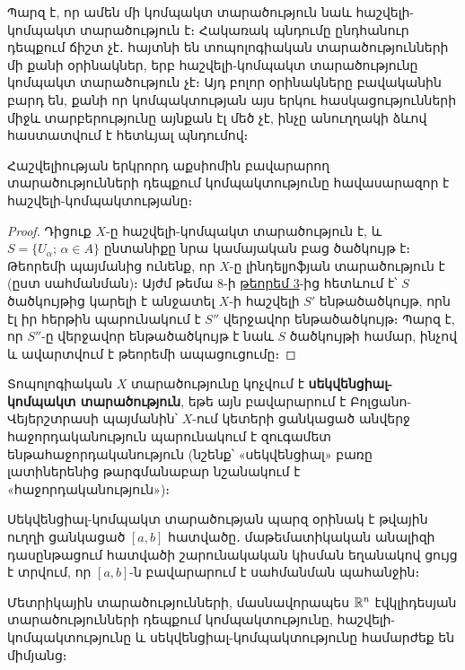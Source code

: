 \documentclass[./main.tex]{subfiles}
\begin{document}
\par Պարզ է, որ ամեն մի կոմպակտ տարածություն նաև հաշվելի-կոմպակտ տարա\-ծություն է։ Հակառակ պնդումը ընդհանուր դեպքում ճիշտ չէ․ հայտնի են տոպոլոգի\-ա\-կան տարածությունների մի քանի օրինակներ, երբ հաշվելի-կոմպակտ տարա\-ծու\-թյունը կոմպակտ տարածություն չէ։ Այդ բոլոր օրինակները բավականին բարդ են, քանի որ կոմպակտության այս երկու հասկացությունների միջև տարբերու\-թյու\-նը այնքան էլ մեծ չէ, ինչը անուղղակի ձևով հաստատվում է հետևյալ պնդումով։

\begin{theorem}\label{ch17thm11}
Հաշվելիության երկրորդ աքսիոմին բավարարող տարածություն\-նե\-րի դեպքում կոմպակտությունը հավասարազոր է հաշվելի-կոմպակտությանը։
\end{theorem}

\begin{proof}
Դիցուք $X$-ը հաշվելի-կոմպակտ տարածություն է, և $S = \{U_\alpha;\, {\alpha \in A\}}$ ընտանիքը նրա կամայական բաց ծածկույթ է։ Թեորեմի պայմանից ունենք, որ $X\textrm{-ը}$ լինդելյոֆյան տարածություն է (ըստ սահմանման)։ Այժմ թեմա 8-ի \hyperref[ch8thm3]{թեորեմ 3}-ից հետևում է՝ $S$ ծածկույթից կարելի է անջատել $X\textrm{-ի}$ հաշվելի $S'$ ենթածածկույթ, որն էլ իր հերթին պարունակում է $S''$ վերջավոր ենթածածկույթ։ Պարզ է, որ $S''$-ը վեր\-ջավոր ենթածածկույթ է նաև $S$ ծածկույթի համար, ինչով և ավարտվում է թեորեմի ապացուցումը։
\end{proof}

\begin{definition}
Տոպոլոգիական $X$ տարածությունը կոչվում է \textbf{սեկվենցիալ-կոմ\-պակտ տարածություն}, եթե այն բավարարում է Բոլցանո-Վեյերշտրասի պայմանին՝ $X$-ում կետերի ցանկացած անվերջ հաջորդականություն պարունակում է զուգամետ ենթահաջորդականություն (նշենք՝ «սեկվենցիալ» բառը լատիներենից թարգմանա\-բար նշանակում է «հաջորդականություն»)։
\end{definition}

\par Սեկվենցիալ-կոմպակտ տարածության պարզ օրինակ է թվային ուղղի ցանկա\-ցած $[a, b]$ հատվածը․ մաթեմատիկական անալիզի դասընթացում հատվածի շարու\-նա\-կական կիսման եղանակով ցույց է տրվում, որ $[a, b]$-ն բավարարում է սահման\-ման պա\-հանջին։

\begin{theorem}\label{ch17thm12}
Մետրիկային տարածությունների, մասնավորապես $\mathbb{R}^n$ էվկլի\-դես\-յան տարածությունների դեպքում կոմպակտությունը, հաշվելի-կոմպակտությունը և սեկվենցիալ-կոմպակտությունը համարժեք են միմյանց։
\end{theorem}
\end{document}
